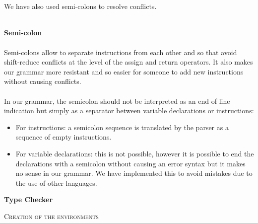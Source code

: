 \documentclass[11pt]{report}
\begin{document}
\\ \\
\newpage
We have also used semi-colons to resolve conflicts. \\ \\
{} 
\tabto{2cm} \textbf{Semi-colon} \\ \\
\tabto{1cm}Semi-colons allow to separate instructions from each other and so that avoid shift-reduce conflicts at the level of the assign and return operators. It also makes our grammar more resistant and so easier for someone to add new instructions without causing conflicts. \\ \\
\tabto{1cm} In our grammar, the semicolon should not be interpreted as an end of line indication but simply as a separator between variable declarations or instructions:
\begin{itemize}
\item For instructions: a semicolon sequence is translated by the parser as a sequence of empty instructions.
\item For variable declarations: this is not possible, however it is possible to end the declarations with a semicolon without causing an error syntax but it makes no sense in our grammar. We have implemented this to avoid mistakes due to the use of other languages.
\end{itemize}

\newpage

{}
\centerline{\textbf{\Huge Type Checker}}
\vspace*{15pt}

{}

\vspace*{10pt}
\vspace*{3pt}
{}
\tabto{1cm} {\Large \textsc{Creation of the environments}}
\end{document}

